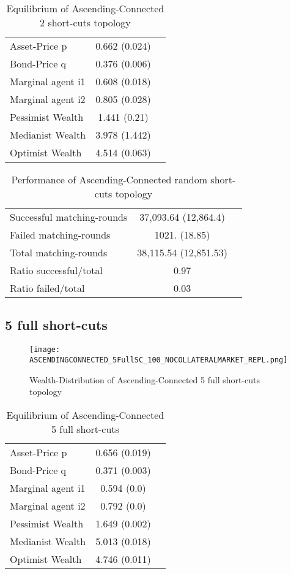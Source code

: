 \documentclass[Bachelorarbeit.tex]{subfiles}
\begin{document}
\begin{table}[H]
	\caption{Equilibrium of Ascending-Connected 2 short-cuts topology}
	\centering
	\begin{tabular} { l c r }
		\hline
		Asset-Price p & 0.662 (0.024) \\
		Bond-Price q & 0.376 (0.006) \\
		Marginal agent i1 & 0.608 (0.018) \\
		Marginal agent i2 & 0.805 (0.028) \\
		\hline
		Pessimist Wealth & 1.441 (0.21) \\
		Medianist Wealth & 3.978 (1.442) \\
		Optimist Wealth & 4.514 (0.063) \\
		\hline
	\end{tabular}
\end{table} 

\begin{table}[H]
	\caption{Performance of Ascending-Connected random short-cuts topology}
	\centering
	\begin{tabular} { l c r }
		\hline
		Successful matching-rounds& 37,093.64 (12,864.4) \\
		Failed matching-rounds & 1021. (18.85) \\
		Total matching-rounds & 38,115.54 (12,851.53) \\
		\hline
		Ratio successful/total & 0.97 \\
		Ratio failed/total & 0.03 \\
		\hline
	\end{tabular}
\end{table}

\subsection{5 full short-cuts}
\begin{figure}[H]
	\centering
  \texttt{[image: ASCENDINGCONNECTED\_5FullSC\_100\_NOCOLLATERALMARKET\_REPL.png]}
	\caption{Wealth-Distribution of Ascending-Connected 5 full short-cuts topology}
	\label{fig:wealth_ASCENDINGCONNECTED_5FullSC_100_NOCOLLATERALMARKET_REPL}
\end{figure}

\begin{table}[H]
	\caption{Equilibrium of Ascending-Connected 5 full short-cuts}
	\centering
	\begin{tabular} { l c r }
		\hline
		Asset-Price p & 0.656 (0.019) \\
		Bond-Price q & 0.371 (0.003) \\
		Marginal agent i1 & 0.594 (0.0) \\
		Marginal agent i2 & 0.792 (0.0) \\
		\hline
		Pessimist Wealth & 1.649 (0.002) \\
		Medianist Wealth & 5.013 (0.018) \\
		Optimist Wealth & 4.746 (0.011) \\
		\hline
	\end{tabular}
\end{table} 
\end{document}
